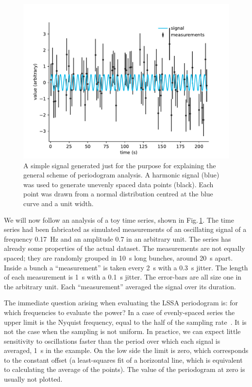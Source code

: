 \begin{figure}
  \centering \includegraphics[width=0.8\linewidth]{gfx/axions/basic_signal.pdf}
  \caption{A simple signal generated just for the purpose for explaining the general scheme of periodogram analysis. A harmonic signal (blue) was used to generate unevenly spaced data points (black). Each point was drawn from a normal distribution centred at the blue curve and a unit width.}\label{fig:basic_signal}
\end{figure}

We will now follow an analysis of a toy time series, shown in Fig.\,\ref{fig:basic_signal}. The time series had been fabricated as simulated measurements of an oscillating signal of a frequency \SI{0.17}{\hertz} and an amplitude \num{0.7} in an arbitrary unit. The series has already some properties of the actual dataset. The measurements are not equally spaced; they are randomly grouped in \SI{10}{\second} long bunches, around \SI{20}{\second} apart. Inside a bunch a ``measurement'' is taken every \SI{2}{\second} with a \SI{0.3}{\second} jitter. The length of each measurement is \SI{1}{\second} with a \SI{0.1}{\second} jitter. The error-bars are all size one in the arbitrary unit. Each ``measurement'' averaged the signal over its duration.

The immediate question arising when evaluating the LSSA periodogram is: for which frequencies to evaluate the power? In a case of evenly-spaced series the upper limit is the Nyquist frequency, equal to the half of the sampling rate~\cite{Shannon1949}. It is not the case when the sampling is not uniform. In practice, we can expect little sensitivity to oscillations faster than the period over which each signal is averaged, \SI{1}{\second} in the example. On the low side the limit is zero, which corresponds to the constant offset (a least-squares fit of a horizontal line, which is equivalent to calculating the average of the points). The value of the periodogram at zero is usually not plotted.

